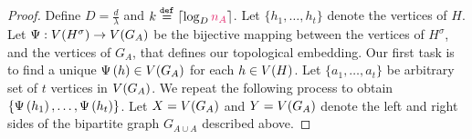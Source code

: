 \documentclass[11pt]{article}
\newcommand{\Subdivision}[2]{{#1}^{#2}}
\newcommand{\na}{\textcolor{razzmatazz}{n_A}}
\newcommand{\BipartiteG}{G_{A \cup A}}
\newcommand{\EmbeddingFunc}{\Psi}
\begin{document}
\begin{proof}
Define $D = \frac{d}{\lambda}$ and $k \Def \lceil\log_D\na\rceil$.
Let $\{ h_1, \dots, h_t\}$ denote the vertices of $H$.
Let $\EmbeddingFunc: \Vertices{\Subdivision{H}{\sigma}} \rightarrow \Vertices{G_A}$ be the bijective mapping between the vertices of $\Subdivision{H}{\sigma}$, and the vertices of $G_A$, that defines our topological embedding.
Our first task is to find a unique $\Psi\left(h\right) \in V(G_A)$ for each $h \in V(H)$.
Let $\{a_1, \dots, a_{t}\}$ be arbitrary set of $t$ vertices in $V(G_A)$.
We repeat the following process to obtain $\{ \Psi\left(h_1\right), \dots, \Psi\left(h_t\right)\}$.
Let $X=V(G_A)$ and $Y=V(G_A)$ denote the left and right sides of the bipartite graph $\BipartiteG$ described above.


\end{proof}
\end{document}

